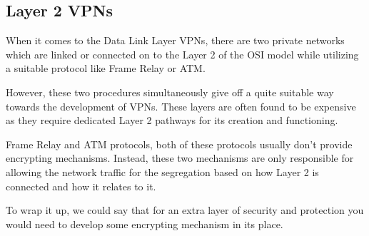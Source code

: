 \subsectionend

\subsection{Layer 2 VPNs}
\label{ssec:layer_2_vpns}

When it comes to the Data Link Layer VPNs, there are two private networks which are linked or connected on to the Layer 2 of the OSI model while utilizing a suitable protocol like Frame Relay or ATM.

However, these two procedures simultaneously give off a quite suitable way towards the development of VPNs. These layers are often found to be expensive as they require dedicated Layer 2 pathways for its creation and functioning.

Frame Relay and ATM protocols, both of these protocols usually don’t provide encrypting mechanisms. Instead, these two mechanisms are only responsible for allowing the network traffic for the segregation based on how Layer 2 is connected and how it relates to it.

To wrap it up, we could say that for an extra layer of security and protection you would need to develop some encrypting mechanism in its place.
\subsectionend

\sectionend
